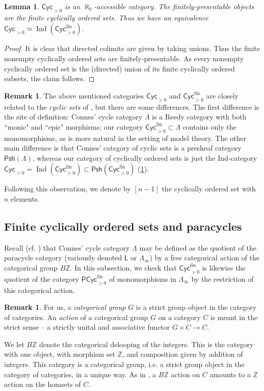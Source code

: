 \documentclass{amsart}
\newcommand{\defterm}[1]{\emph{#1}}
\theoremstyle{plain}
\newtheorem{lem}[thm]{Lemma}
\theoremstyle{definition}
\newtheorem{rmk}[thm]{Remark}
\newcommand{\ints}{\mathbb{Z}}
\newcommand{\Psh}{\mathsf{Psh}}
\DeclareMathOperator{\Ind}{Ind}
\newcommand{\Cyc}{\mathsf{Cyc}}
\newcommand{\fin}{\mathrm{fin}}
\newcommand{\catdeloop}{B}
\newcommand{\Paracyc}{\mathsf{PCyc}}
\begin{document}
\begin{lem}\label{lem:acc}
$\Cyc_{>0}$ is an $\aleph_0$-accessible category. The finitely-presentable objects are the finite cyclically ordered sets. Thus we have an equivalence $\Cyc_{>0} \simeq \Ind(\Cyc^\fin_{>0})$. 
\end{lem}
\begin{proof}
It is clear that directed colimits are given by taking unions. Thus the finite nonempty cyclically ordered sets are finitely-presentable. As every nonempty cyclically ordered set is the (directed) union of its finite cyclically ordered subsets, the claim follows.
\end{proof}


\begin{rmk}
The above mentioned categories $\Cyc_{>0}$ and $\Cyc^\fin_{>0}$ are closely related to the \emph{cyclic sets} of \cite{connes}, but there are some differences. The first difference is the site of definition: Connes' cycle category $\Lambda$ is a Reedy category with both ``monic" and ``epic" morphisms; our category $\Cyc_{>0}^\fin \subset \Lambda$ contains only the monomorphisms, as is more natural in the setting of model theory. The other main difference is that Connes' category of cyclic sets is a presheaf category $\Psh(\Lambda)$, whereas our category of cyclically ordered sets is just the Ind-category $\Cyc_{>0} = \Ind(\Cyc_{>0}^\fin) \subset \Psh(\Cyc_{>0}^\fin)$ (\cref{lem:acc}).

Following this observation, we denote by $[n-1]$ the cyclically ordered set with $n$ elements.
\end{rmk}


\subsection{Finite cyclically ordered sets and paracycles}\label{subsec:paracyclic}

Recall (cf. \cite[Appendix B]{nikolaus-scholze}) that Connes' cycle category $\Lambda$ may be defined as the quotient of the paracycle category (variously denoted $\mathsf L$ or $\Lambda_\infty$) by a free categorical action of the categorical group $\catdeloop \ints$. In this subsection, we check that $\Cyc_{>0}^\fin$ is likewise the quotient of the category $\Paracyc^\fin_{>0}$ of monomorphisms in $\Lambda_\infty$ by the restriction of this categorical action.

\begin{rmk}
    For us, a \defterm{categorical group} $G$ is a strict group object in the category of categories. An \defterm{action} of a categorical group $G$ on a category $C$ is meant in the strict sense -- a strictly unital and associative functor $G \times C \to C$.
    
    We let $B\ints$ denote the categorical delooping of the integers. This is the category with one object, with morphism set $\ints$, and composition given by addition of integers. This category is a categorical group, i.e. a strict group object in the category of categories, in a unique way. As in \cite[Appendix B]{nikolaus-scholze}, a $\catdeloop \ints$ action on $C$ amounts to a $\ints$ action on the homsets of $C$. 
\end{rmk}
\end{document}

